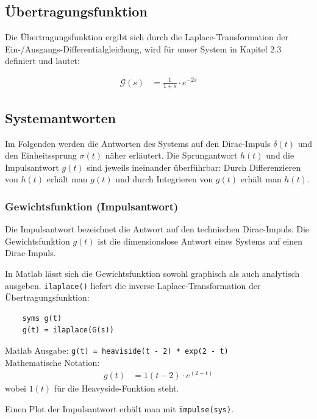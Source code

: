 \subsection{Übertragungsfunktion}
Die Übertragungsfunktion ergibt sich durch die Laplace-Transformation der Ein-/Ausgangs-Differentialgleichung, wird für unser System in Kapitel 2.3 definiert und lautet: 

\begin{align*}
    \mathcal{G}(s) &= \frac{1}{1 + s} \cdot e^{-2s} 
\end{align*}

\subsection{Systemantworten}
Im Folgenden werden die Antworten des Systems auf den Dirac-Impuls $\delta(t)$ und den Einheitssprung $\sigma (t)$ näher erläutert.
Die Sprungantwort $h(t)$ und die Impulsantwort $g(t)$ sind jeweils ineinander überführbar: Durch Differenzieren von $h(t)$ erhält man $g(t)$ und durch Integrieren von $g(t)$ erhält man $h(t)$.
\subsubsection{Gewichtsfunktion (Impulsantwort)}
Die Impulsantwort bezeichnet die Antwort auf den technischen Dirac-Impuls.
Die Gewichtsfunktion $g(t)$ ist die dimensionslose Antwort eines Systems auf einen Dirac-Impuls.

In Matlab lässt sich die Gewichtsfunktion sowohl graphisch als auch analytisch ausgeben.
\texttt{ilaplace()} liefert die inverse Laplace-Transformation der Übertragungsfunktion:
\begin{verbatim}
    syms g(t)
    g(t) = ilaplace(G(s))
\end{verbatim}

Matlab Ausgabe: \texttt{g(t) = heaviside(t - 2) * exp(2 - t)}\\
Mathematische Notation: 
\begin{align*}
    g(t) &=1(t-2)\cdot e^{(2-t)}
\end{align*} wobei $1(t)$ für die Heavyside-Funktion steht.

Einen Plot der Impulsantwort erhält man mit \texttt{impulse(sys)}.

